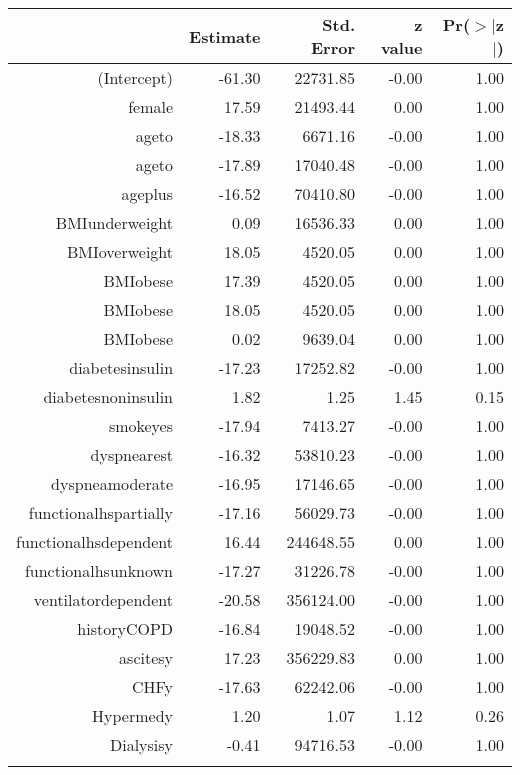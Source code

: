
\bigskip\bigskip
\centering
\begin{tabular}{rrrrr}
  \hline
 & Estimate & Std. Error & z value & Pr($>$$|$z$|$) \\ 
  \hline
(Intercept) & -61.30 & 22731.85 & -0.00 & 1.00 \\ 
  female & 17.59 & 21493.44 & 0.00 & 1.00 \\ 
  age\-65\-to\-74 & -18.33 & 6671.16 & -0.00 & 1.00 \\ 
  age\-75\-to\-84 & -17.89 & 17040.48 & -0.00 & 1.00 \\ 
  age\-85\-plus & -16.52 & 70410.80 & -0.00 & 1.00 \\ 
  BMI\-underweight & 0.09 & 16536.33 & 0.00 & 1.00 \\ 
  BMI\-overweight & 18.05 & 4520.05 & 0.00 & 1.00 \\ 
  BMI\-obese\-1 & 17.39 & 4520.05 & 0.00 & 1.00 \\ 
  BMI\-obese\-2 & 18.05 & 4520.05 & 0.00 & 1.00 \\ 
  BMI\-obese\-3 & 0.02 & 9639.04 & 0.00 & 1.00 \\ 
  diabetes\-insulin & -17.23 & 17252.82 & -0.00 & 1.00 \\ 
  diabetes\-noninsulin & 1.82 & 1.25 & 1.45 & 0.15 \\ 
  smoke\-yes & -17.94 & 7413.27 & -0.00 & 1.00 \\ 
  dyspnea\-rest & -16.32 & 53810.23 & -0.00 & 1.00 \\ 
  dyspnea\-moderate & -16.95 & 17146.65 & -0.00 & 1.00 \\ 
  functional\-hs\-partially & -17.16 & 56029.73 & -0.00 & 1.00 \\ 
  functional\-hs\-dependent & 16.44 & 244648.55 & 0.00 & 1.00 \\ 
  functional\-hs\-unknown & -17.27 & 31226.78 & -0.00 & 1.00 \\ 
  ventilator\-dependent & -20.58 & 356124.00 & -0.00 & 1.00 \\ 
  history\-COPD & -16.84 & 19048.52 & -0.00 & 1.00 \\ 
  ascites\-y & 17.23 & 356229.83 & 0.00 & 1.00 \\ 
  CHF\-y & -17.63 & 62242.06 & -0.00 & 1.00 \\ 
  Hyper\-med\-y & 1.20 & 1.07 & 1.12 & 0.26 \\ 
  Dialysis\-y & -0.41 & 94716.53 & -0.00 & 1.00 \\ 
$$
\end{tabular}
